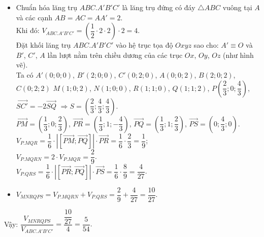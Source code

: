 \begin{ex}
{\begin{center}
		\end{center}
		\begin{itemize}
			\item Chuẩn hóa lăng trụ $ABC.A'B'C'$ là lăng trụ đứng có đáy $\triangle ABC$ vuông tại $A$ và các cạnh $AB=AC=AA'=2$.\\
			Khi đó: $V_{ABC.A'B'C'}=\left(\dfrac{1}{2}\cdot 2\cdot 2\right)\cdot 2=4$.\\
			Đặt khối lăng trụ $ABC.A'B'C'$ vào hệ trục tọa độ $Oxyz$ sao cho: $A'\equiv O$ và $B'$, $C'$, $A$ lần lượt nằm trên chiều dương của các trục $Ox$, $Oy$, $Oz$ (như hình vẽ).\\
			Ta có $A'(0;0;0)$, $B'(2;0;0)$, $C'(0;2;0)$, $A(0;0;2)$, $B(2;0;2)$, $C(0;2;2)$
			$M(1;0;2)$, $N(1;0;0)$, $R(1;1;0)$, $Q(1;1;2)$, $P\left(\dfrac{2}{3};0;\dfrac{4}{3}\right)$, $\overrightarrow{SC'}=-2\overrightarrow{SQ}$
			$\Rightarrow S=\left(\dfrac{2}{3};\dfrac{4}{3};\dfrac{4}{3}\right)$.\\
			$\overrightarrow{PM}=\left(\dfrac{1}{3};0;\dfrac{2}{3}\right)$, $\overrightarrow{PR}=\left(\dfrac{1}{3};1;-\dfrac{4}{3}\right)$, $\overrightarrow{PQ}=\left(\dfrac{1}{3};1;\dfrac{2}{3}\right)$, $\overrightarrow{PS}=\left(0;\dfrac{4}{3};0\right)$.\\
			$V_{P.MQR}=\dfrac{1}{6}\cdot \left| \left[\overrightarrow{PM};\overrightarrow{PQ}\right]\right|\cdot \overrightarrow{PR}=\dfrac{1}{6}\cdot \dfrac{2}{3}=\dfrac{1}{9}$;\\ $V_{P.MQRN}=2\cdot{V_{P.MQR}}=\dfrac{2}{9}$.\\
			$V_{P.QRS}=\dfrac{1}{6}\cdot \left| \left[\overrightarrow{PR};\overrightarrow{PQ}\right]\right|\cdot \overrightarrow{PS}=\dfrac{1}{6}\cdot \dfrac{8}{9}=\dfrac{4}{27}$.\\
			\item $V_{MNRQPS}=V_{P.MQRN}+V_{P.QRS}=\dfrac{2}{9}+\dfrac{4}{27}=\dfrac{10}{27}$.
		\end{itemize}
		Vậy: $\dfrac{V_{MNRQPS}}{V_{ABC.A'B'C'}}=\dfrac{\dfrac{10}{27}}{4}=\dfrac{5}{54}.$}
\end{ex}
